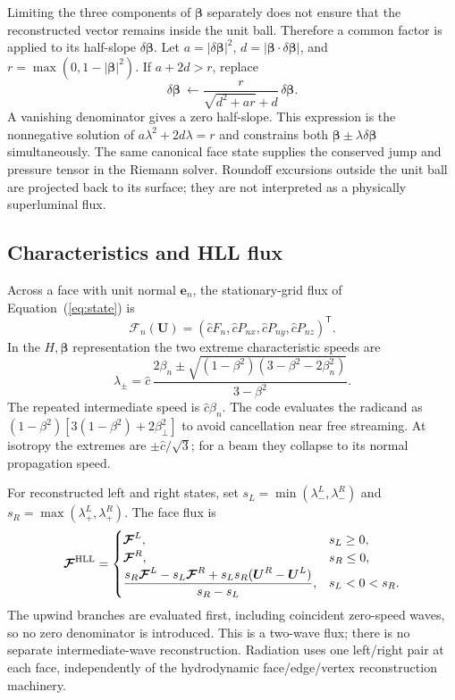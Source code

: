 \documentclass[manuscript]{aastex7}
\newcommand{\vct}[1]{\boldsymbol{#1}}
\newcommand{\chat}{\hat{c}}
\begin{document}
Limiting the three components of $\vct{\beta}$ separately does not ensure that
the reconstructed vector remains inside the unit ball. Therefore a common
factor is applied to its half-slope $\delta\vct{\beta}$.
Let $a=|\delta\vct{\beta}|^2$, $d=|\vct{\beta}\cdot\delta\vct{\beta}|$, and
$r=\max(0,1-|\vct{\beta}|^2)$. If $a+2d>r$, replace
\begin{equation}
 \delta\vct{\beta}\ \longleftarrow
 \frac{r}{\sqrt{d^2+ar}+d}\,\delta\vct{\beta}.
 \label{eq:vectorlimit}
\end{equation}
A vanishing denominator gives a zero half-slope. This expression is the
nonnegative solution of $a\lambda^2+2d\lambda=r$ and constrains both
$\vct{\beta}\pm\lambda\delta\vct{\beta}$ simultaneously. The same canonical
face state supplies the conserved jump and pressure tensor in the Riemann
solver. Roundoff excursions outside the unit ball are projected back to its
surface; they are not interpreted as a physically superluminal flux.

\subsection{Characteristics and HLL flux}
Across a face with unit normal $\vct{e}_n$, the stationary-grid flux of
Equation~(\ref{eq:state}) is
\begin{equation}
 \vct{\mathcal{F}}_n(\vct{U})=
       (\chat F_n,\chat P_{nx},\chat P_{ny},\chat P_{nz})^{\mathsf T}.
 \label{eq:pdeflux}
\end{equation}
In the $H,\vct{\beta}$ representation the two extreme characteristic speeds
are \citep{HanawaAudit2014}
\begin{equation}
 \lambda_\pm=\chat\,
 \frac{2\beta_n\pm\sqrt{(1-\beta^2)(3-\beta^2-2\beta_n^2)}}{3-\beta^2}.
 \label{eq:eigenvalues}
\end{equation}
The repeated intermediate speed is $\chat \beta_n$. The code evaluates the
radicand as $(1-\beta^2)[3(1-\beta^2)+2\beta_\perp^2]$ to avoid cancellation
near free streaming. At isotropy the extremes are $\pm\chat/\sqrt{3}$;
for a beam they collapse to its normal propagation speed.

For reconstructed left and right states, set
$s_L=\min(\lambda_-^L,\lambda_-^R)$ and
$s_R=\max(\lambda_+^L,\lambda_+^R)$. The face flux is
\begin{equation}
 \vct{\mathcal{F}}^{\rm HLL}=
 \begin{cases}
 \vct{\mathcal{F}}^L,&s_L\geq0,\\
 \vct{\mathcal{F}}^R,&s_R\leq0,\\
 \displaystyle\frac{s_R\vct{\mathcal{F}}^L-s_L\vct{\mathcal{F}}^R
       +s_Ls_R(\vct{U}^R-\vct{U}^L)}{s_R-s_L},&s_L<0<s_R.
 \end{cases}
 \label{eq:hll}
\end{equation}
The upwind branches are evaluated first, including coincident zero-speed
waves, so no zero denominator is introduced. This is a two-wave flux;
there is no separate intermediate-wave reconstruction. Radiation uses one
left/right pair at each face, independently of the hydrodynamic
face/edge/vertex reconstruction machinery.
\end{document}
